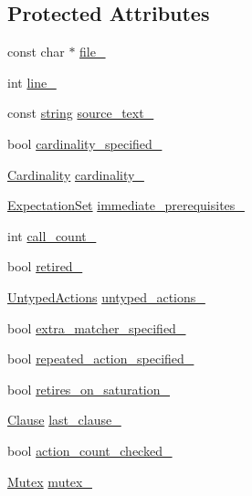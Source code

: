 \subsection*{Protected Attributes}
\begin{DoxyCompactItemize}
\item 
const char $\ast$ \hyperlink{classtesting_1_1internal_1_1ExpectationBase_afabf690537298bbb84e9b443f62d7e97}{file\+\_\+}
\item 
int \hyperlink{classtesting_1_1internal_1_1ExpectationBase_ab8143119e4b686ff1bb6c985924da57a}{line\+\_\+}
\item 
const \hyperlink{namespacetesting_1_1internal_a8e8ff5b11e64078831112677156cb111}{string} \hyperlink{classtesting_1_1internal_1_1ExpectationBase_a8803b5fa8354205a6b57e21a704acbef}{source\+\_\+text\+\_\+}
\item 
bool \hyperlink{classtesting_1_1internal_1_1ExpectationBase_ad2ca7220ed1a395bd850ff06c500a402}{cardinality\+\_\+specified\+\_\+}
\item 
\hyperlink{classtesting_1_1Cardinality}{Cardinality} \hyperlink{classtesting_1_1internal_1_1ExpectationBase_ad0aedcc01c0c9a998952a2b2f486595c}{cardinality\+\_\+}
\item 
\hyperlink{classtesting_1_1ExpectationSet}{Expectation\+Set} \hyperlink{classtesting_1_1internal_1_1ExpectationBase_a186eff0fdcacc8c1e1a2becdec11d3cd}{immediate\+\_\+prerequisites\+\_\+}
\item 
int \hyperlink{classtesting_1_1internal_1_1ExpectationBase_aea95d46f7583566e3f7a081b0668ad4c}{call\+\_\+count\+\_\+}
\item 
bool \hyperlink{classtesting_1_1internal_1_1ExpectationBase_a0afd852f5d7863effc3d304dac6a44cf}{retired\+\_\+}
\item 
\hyperlink{classtesting_1_1internal_1_1ExpectationBase_a9b21e82059961b9f1198d3f5d518254f}{Untyped\+Actions} \hyperlink{classtesting_1_1internal_1_1ExpectationBase_a9558ff6b8b1b7e3a99fac1f93d1826da}{untyped\+\_\+actions\+\_\+}
\item 
bool \hyperlink{classtesting_1_1internal_1_1ExpectationBase_a34f599ac7ae4f1fb7567e0d4c9fadcba}{extra\+\_\+matcher\+\_\+specified\+\_\+}
\item 
bool \hyperlink{classtesting_1_1internal_1_1ExpectationBase_abecd382b79252ffc0779d51e058b681c}{repeated\+\_\+action\+\_\+specified\+\_\+}
\item 
bool \hyperlink{classtesting_1_1internal_1_1ExpectationBase_a74802f3bedf4ab023b30ee6bb275a4d8}{retires\+\_\+on\+\_\+saturation\+\_\+}
\item 
\hyperlink{classtesting_1_1internal_1_1ExpectationBase_a450f34b979ec5814c91d4eab6b78cfc2}{Clause} \hyperlink{classtesting_1_1internal_1_1ExpectationBase_a584f296e53b4cc002ddf5e65e44d72d9}{last\+\_\+clause\+\_\+}
\item 
bool \hyperlink{classtesting_1_1internal_1_1ExpectationBase_a19933e346f6493005437bdd6812c7a29}{action\+\_\+count\+\_\+checked\+\_\+}
\item 
\hyperlink{classtesting_1_1internal_1_1Mutex}{Mutex} \hyperlink{classtesting_1_1internal_1_1ExpectationBase_a364f5473591d08d0ac03595c9050c13e}{mutex\+\_\+}
\end{DoxyCompactItemize}
